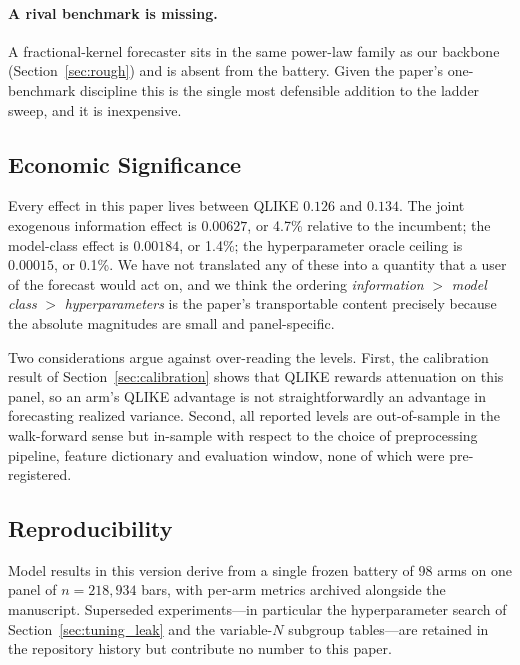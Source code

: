 \paragraph{A rival benchmark is missing.} A fractional-kernel forecaster sits
in the same power-law family as our backbone (Section~\ref{sec:rough}) and is
absent from the battery. Given the paper's one-benchmark discipline this is the
single most defensible addition to the ladder sweep, and it is inexpensive.

\subsection{Economic Significance}
\label{sec:economic}

Every effect in this paper lives between QLIKE $0.126$ and $0.134$. The joint
exogenous information effect is $0.00627$, or 4.7\% relative to the incumbent;
the model-class effect is $0.00184$, or 1.4\%; the hyperparameter oracle
ceiling is $0.00015$, or 0.1\%. We have not translated any of these into a
quantity that a user of the forecast would act on, and we think the ordering
\emph{information} $>$ \emph{model class} $>$ \emph{hyperparameters} is the
paper's transportable content precisely because the absolute magnitudes are
small and panel-specific.

Two considerations argue against over-reading the levels. First, the
calibration result of Section~\ref{sec:calibration} shows that QLIKE rewards
attenuation on this panel, so an arm's QLIKE advantage is not straightforwardly
an advantage in forecasting realized variance. Second, all reported levels are
out-of-sample in the walk-forward sense but in-sample with respect to the
choice of preprocessing pipeline, feature dictionary and evaluation window,
none of which were pre-registered.

\subsection{Reproducibility}
\label{sec:repro}

Model results in this version derive from a single frozen battery of 98 arms on
one panel of $n = 218{,}934$ bars, with per-arm metrics archived alongside the
manuscript. Superseded experiments---in particular the hyperparameter search of
Section~\ref{sec:tuning_leak} and the variable-$N$ subgroup tables---are
retained in the repository history but contribute no number to this paper.

